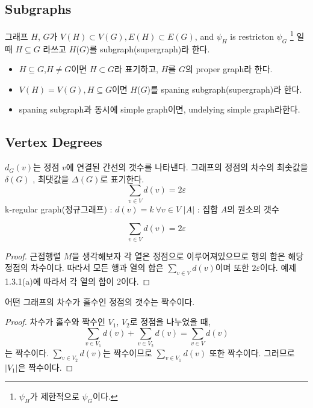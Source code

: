 \subsection{Subgraphs}
\begin{dfn}[subgraph]
    그래프 $H$, $G$가 $ V(H) \subset V(G), E(H) \subset E(G)$, and $\psi_{H}$ is restricton $\psi_{G}$ \protect\footnote{$\psi_{H}$가 제한적으로 $\psi_{G}$이다.} 일때  $H \subseteq G$ 라쓰고 $H$($G$)를 subgraph(supergraph)라 한다.

    \begin{itemize}
        \item $H \subseteq G$,$H\neq G $이면 $ H \subset G$라 표기하고, $H$를  $G$의 proper graph라 한다.
        \item $V(H) = V(G) , H \subseteq G $이면 $H$($G$)를  spaning subgraph(supergraph)라 한다.
        \item spaning subgraph과 동시에 simple graph이면, undelying simple graph라한다.
    \end{itemize}
\end{dfn}
\subsection{Vertex Degrees}
\begin{dfn}[degree(차수)] $d_G(v)$는 정점 $v$에 연결된 간선의 갯수를 나타낸다. 그래프의 정점의 차수의 최솟값을 $\delta(G)$ , 최댓값을 $\Delta(G)$로 표기한다.
    \[
        \sum_{v \in V} d(v) = 2 \varepsilon  
    \]
    k-regular graph(정규그래프) : $d(v) = k \:\forall v \in V$
    $|A|$ : 집합 $A$의 원소의 갯수
\end{dfn}

\begin{theorem}
    \[
        \sum_{v \in V} d(v) = 2\varepsilon  
    \]
\end{theorem}

\begin{proof}
    근접행렬 $M$을 생각해보자 각 열은 정점으로 이루어져있으므로 행의 합은 해당 정점의 차수이다. 따라서 모든 행과 열의 합은 $\sum_{v \in V} d(v)$이며 또한 $2\varepsilon $이다. 예제 1.3.1(a)에 따라서 각 열의 합이 2이다. 
\end{proof}

\begin{corollary}
    어떤 그래프의 차수가 홀수인 정점의 갯수는 짝수이다.
\end{corollary}

\begin{proof}
    차수가 홀수와 짝수인 $V_1$, $V_2$로 정점을 나누었을 때,
    \[
        \sum_{v \in V_1} d(v) + \sum_{v \in V_2} d(v) = \sum_{v \in V} d(v)
    \]
    는 짝수이다. $\sum_{v \in V_2} d(v)$는 짝수이므로 $\sum_{v \in V_1} d(v)$ 또한 짝수이다. 그러므로 $|V_1|$은 짝수이다.
\end{proof}

